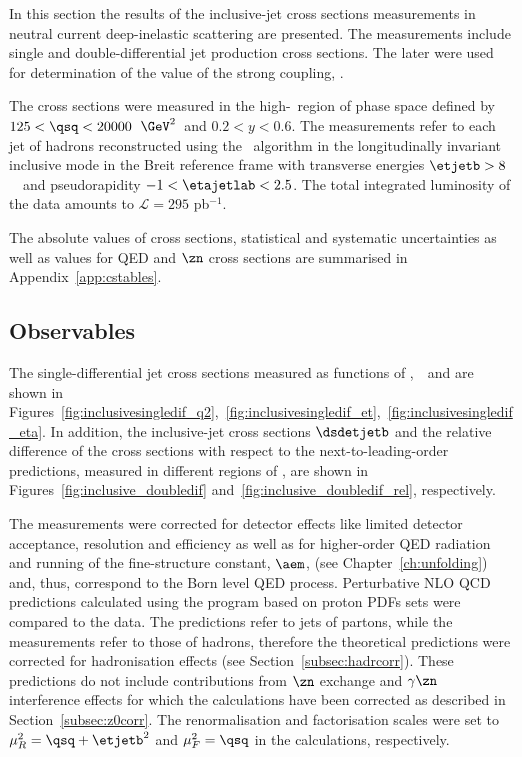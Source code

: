In this section the results of the inclusive-jet cross sections measurements in neutral current deep-inelastic scattering are presented. The measurements include single and double-differential jet production cross sections. The later were used for determination of the value of the strong coupling, \asz. 

The cross sections were measured in the high-\qsq~region of phase space defined by $125 < \qsq < 20000$~$\GeV^2$~and $0.2<y<0.6$. The measurements refer to each jet of hadrons reconstructed using the \kt\, algorithm in the longitudinally invariant inclusive mode in the Breit reference frame with transverse energies $\etjetb > 8$~\GeV~and pseudorapidity $-1<\etajetlab<2.5$. The total integrated luminosity of the data amounts to $\mathcal{L}=295$ pb$^{-1}$.

The absolute values of cross sections, statistical and systematic uncertainties as well as values for QED and $\zn$ cross sections are summarised in Appendix~\ref{app:cstables}.

\subsection{Observables}
The single-differential jet cross sections measured as functions of \qsq,~\etjetb~and \etajetlab are shown in Figures~\ref{fig:inclusivesingledif_q2},~\ref{fig:inclusivesingledif_et},~\ref{fig:inclusivesingledif_eta}. In addition, the inclusive-jet cross sections $\dsdetjetb$ and the relative difference of the cross sections with respect to the next-to-leading-order predictions, measured in different regions of \qsq, are shown in Figures~\ref{fig:inclusive_doubledif} and~\ref{fig:inclusive_doubledif_rel}, respectively.

The measurements were corrected for detector effects like limited detector acceptance, resolution and efficiency as well as for higher-order QED radiation and running of the fine-structure constant, $\aem$, (see Chapter~\ref{ch:unfolding}) and, thus, correspond to the Born level QED process. Perturbative NLO QCD predictions calculated using the \nlojet program based on  proton PDFs sets were compared to the data. The \nlojet predictions refer to jets of partons, while the measurements refer to those of hadrons, therefore the theoretical predictions were corrected for hadronisation effects (see Section~\ref{subsec:hadrcorr}). These predictions do not include contributions from $\zn$ exchange and $\gamma\zn$ interference effects for which the calculations have been corrected as described in Section~\ref{subsec:z0corr}. The renormalisation and factorisation scales were set to $\mu_R^2 = \qsq + \etjetb^2$ and $\mu_F^2 = \qsq$ in the calculations, respectively.

